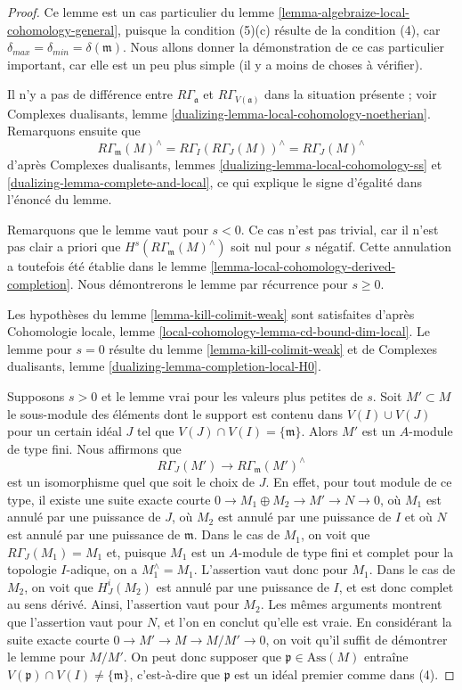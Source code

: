 \begin{proof}
Ce lemme est un cas particulier du
lemme \ref{lemma-algebraize-local-cohomology-general},
puisque la condition (5)(c) résulte de la condition (4),
car $\delta_{max} = \delta_{min} = \delta(\mathfrak m)$.
Nous allons donner la démonstration de ce cas particulier important,
car elle est un peu plus simple (il y a moins de choses à vérifier).

\medskip\noindent
Il n'y a pas de différence entre $R\Gamma_\mathfrak a$ et
$R\Gamma_{V(\mathfrak a)}$ dans la situation présente ; voir
Complexes dualisants, lemme \ref{dualizing-lemma-local-cohomology-noetherian}.
Remarquons ensuite que
$$
R\Gamma_\mathfrak m(M)^\wedge =
R\Gamma_I(R\Gamma_J(M))^\wedge =
R\Gamma_J(M)^\wedge
$$
d'après Complexes dualisants, lemmes \ref{dualizing-lemma-local-cohomology-ss} et
\ref{dualizing-lemma-complete-and-local},
ce qui explique le signe d'égalité dans l'énoncé du lemme.

\medskip\noindent
Remarquons que le lemme vaut pour $s < 0$. Ce cas n'est pas trivial, car
il n'est pas clair a priori que $H^s(R\Gamma_\mathfrak m(M)^\wedge)$
soit nul pour $s$ négatif. Cette annulation a toutefois été établie
dans le lemme \ref{lemma-local-cohomology-derived-completion}.
Nous démontrerons le lemme par récurrence pour $s \geq 0$.

\medskip\noindent
Les hypothèses du lemme \ref{lemma-kill-colimit-weak}
sont satisfaites d'après Cohomologie locale, lemme
\ref{local-cohomology-lemma-cd-bound-dim-local}.
Le lemme pour $s = 0$ résulte du lemme \ref{lemma-kill-colimit-weak} et de
Complexes dualisants, lemme \ref{dualizing-lemma-completion-local-H0}.

\medskip\noindent
Supposons $s > 0$ et le lemme vrai pour les valeurs plus petites de $s$.
Soit $M' \subset M$ le sous-module des éléments dont le
support est contenu dans $V(I) \cup V(J)$ pour un certain
idéal $J$ tel que $V(J) \cap V(I) = \{\mathfrak m\}$.
Alors $M'$ est un $A$-module de type fini.
Nous affirmons que
$$
R\Gamma_J(M') \to R\Gamma_\mathfrak m(M')^\wedge
$$
est un isomorphisme quel que soit le choix de $J$.
En effet, pour tout module de ce type, il existe une suite exacte courte
$0 \to M_1 \oplus M_2 \to M' \to N \to 0$, où
$M_1$ est annulé par une puissance de $J$, où $M_2$ est annulé
par une puissance de $I$ et où $N$ est annulé par une puissance de $\mathfrak m$.
Dans le cas de $M_1$, on voit que $R\Gamma_J(M_1) = M_1$ et,
puisque $M_1$ est un $A$-module de type fini et complet pour la topologie $I$-adique,
on a $M_1^\wedge = M_1$. L'assertion vaut donc pour $M_1$.
Dans le cas de $M_2$, on voit que $H^i_J(M_2)$ est annulé
par une puissance de $I$, et est donc complet au sens dérivé. Ainsi, l'assertion vaut
pour $M_2$. Les mêmes arguments montrent que l'assertion vaut pour $N$,
et l'on en conclut qu'elle est vraie. En considérant la
suite exacte courte $0 \to M' \to M \to M/M' \to 0$,
on voit qu'il suffit de démontrer le lemme pour $M/M'$.
On peut donc supposer que $\mathfrak p \in \text{Ass}(M)$
entraîne $V(\mathfrak p) \cap V(I) \not = \{\mathfrak m\}$, c'est-à-dire que
$\mathfrak p$ est un idéal premier comme dans (4).


\end{proof}

